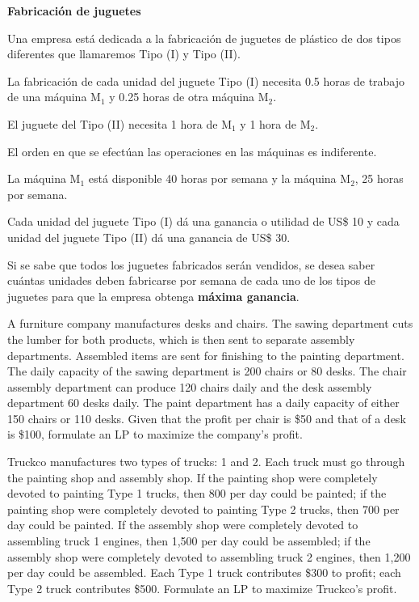 \begin{Ejer}
\textbf{ Fabricaci\'on de juguetes} 

Una empresa est\'a dedicada a la fabricaci\'on de juguetes de pl\'astico de dos tipos diferentes que llamaremos Tipo (I) y Tipo (II).

La fabricaci\'on de cada unidad del juguete Tipo (I) necesita 0.5 horas de trabajo de una m\'aquina M$_1$ y 0.25 horas de otra m\'aquina M$_2$.

El juguete del Tipo (II) necesita 1 hora de M$_1$ y 1 hora de M$_2$.

El orden en que se efect\'uan las operaciones en las m\'aquinas es indiferente.

La m\'aquina M$_1$ est\'a disponible 40 horas por semana y la m\'aquina M$_2$, 25 horas por semana.

Cada unidad del juguete Tipo (I) d\'a una ganancia o utilidad de US\$ 10 y cada unidad del juguete Tipo (II) d\'a una ganancia de US\$ 30.

Si se sabe que todos los juguetes fabricados ser\'an vendidos, se desea saber cu\'antas unidades deben fabricarse por semana de cada uno de los tipos de juguetes para que la empresa obtenga \textbf{m\'axima ganancia}.
\end{Ejer}

\begin{Ejer}
 A furniture company manufactures desks and chairs. The sawing department cuts the lumber for both products, which is then sent to separate assembly departments. Assembled items are sent for finishing to the painting department. The daily capacity of the sawing department is 200 chairs or 80 desks. The chair assembly department can produce 120 chairs daily and the desk assembly department 60 desks daily. The paint department has a daily capacity of either 150 chairs or 110 desks. Given that the profit per chair is \$50 and that of a desk is \$100, formulate an LP to maximize the company's profit.

\end{Ejer}

\begin{Ejer} Truckco manufactures two types of trucks: 1 and 2. Each truck must go through the painting shop and assembly shop. If the painting shop were completely devoted to painting Type 1 trucks, then 800 per day could be painted; if the painting shop were completely devoted to painting Type 2 trucks, then 700 per day could be painted. If the assembly shop were completely devoted to assembling truck 1 engines, then 1,500 per day could be assembled; if the assembly shop were completely devoted to assembling truck 2 engines, then 1,200 per day could be assembled. Each Type 1 truck contributes \$300 to profit; each Type 2 truck contributes \$500. Formulate an LP to maximize Truckco's profit.

\end{Ejer}

